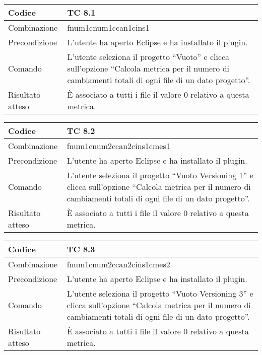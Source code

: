 \begin{table}[ht]
\begin{tabular}{|p{3cm}|p{9cm}|}
\hline
\cellcolor{lightgray}Codice				& TC 8.1								\\
\hline
\cellcolor{lightgray}Combinazione		& fnum1cnum1ccan1cins1									\\
\hline
\cellcolor{lightgray}Precondizione		& L'utente ha aperto Eclipse e ha installato il plugin.		\\
\hline
\cellcolor{lightgray}Comando			& L'utente seleziona il progetto ``Vuoto''  e clicca sull'opzione ``Calcola metrica per il numero di cambiamenti totali di ogni file di un dato progetto''.	\\
\hline
\cellcolor{lightgray}Risultato atteso	& È associato a tutti i file il valore 0 relativo a questa metrica.\\
\hline
\end{tabular}
\end{table}

\begin{table}[ht]
\begin{tabular}{|p{3cm}|p{9cm}|}
\hline
\cellcolor{lightgray}Codice				& TC 8.2								\\
\hline
\cellcolor{lightgray}Combinazione		& fnum1cnum2ccan2cins1cmes1									\\
\hline
\cellcolor{lightgray}Precondizione		& L'utente ha aperto Eclipse e ha installato il plugin.		\\
\hline
\cellcolor{lightgray}Comando			& L'utente seleziona il progetto ``Vuoto Versioning 1''  e clicca sull'opzione ``Calcola metrica per il numero di cambiamenti totali di ogni file di un dato progetto''.	\\
\hline
\cellcolor{lightgray}Risultato atteso	& È associato a tutti i file il valore 0 relativo a questa metrica.\\
\hline
\end{tabular}
\end{table}

\begin{table}[ht]
\begin{tabular}{|p{3cm}|p{9cm}|}
\hline
\cellcolor{lightgray}Codice				& TC 8.3								\\
\hline
\cellcolor{lightgray}Combinazione		& fnum1cnum2ccan2cins1cmes2									\\
\hline
\cellcolor{lightgray}Precondizione		& L'utente ha aperto Eclipse e ha installato il plugin.		\\
\hline
\cellcolor{lightgray}Comando			& L'utente seleziona il progetto ``Vuoto Versioning 3''  e clicca sull'opzione ``Calcola metrica per il numero di cambiamenti totali di ogni file di un dato progetto''.	\\
\hline
\cellcolor{lightgray}Risultato atteso	& È associato a tutti i file il valore 0 relativo a questa metrica.\\
\hline
\end{tabular}
\end{table}

